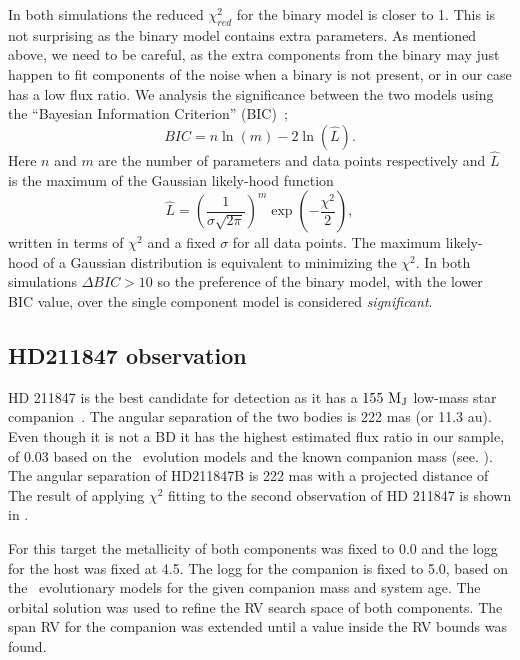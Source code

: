 In both simulations the reduced \(\chi^2_{red}\) for the binary model is closer to 1. This is not surprising as the binary model contains extra parameters. As mentioned above, we need to be careful, as the extra components from the binary may just happen to fit components of the noise when a binary is not present, or in our case has a low flux ratio.
{\rd{} We analysis the significance between the two models using the ``Bayesian Information Criterion'' ({BIC})~\citep{schwarz_estimating_1978}; }
\begin{equation}
{BIC} = n\ln{(m)} - 2\ln{(\hat{L})}.
\end{equation}
{\rd{} Here \(n\) and \(m\) are the number of parameters and data points respectively and \(\hat{L}\) is the maximum of the Gaussian likely-hood function }
\begin{equation}
\hat{L} = {\left(\frac{1}{\sigma \sqrt{2\pi}}\right)}^{m} \exp{\left(-\frac{\chi^2}{2}\right)},
\end{equation}
{\rd{} written in terms of \(\chi^2\) and a fixed \(\sigma\) for all data points. The maximum likely-hood of a Gaussian distribution is equivalent  to minimizing the \(\chi^2\). In both simulations \(\Delta {BIC} >10\) so the preference of the binary model, with the lower {BIC} value, over the single component model is considered \emph{significant}.}



\subsection{HD211847 observation}
\label{subsection:results-hd211847}
{HD 211847} is the best candidate for detection as it has a \(\rm 155~M_J\) low-mass star companion~\citet{moutou_eccentricity_2017}. The angular separation of the two bodies is 222 mas (or 11.3 au). Even though it is not a BD it has the highest estimated flux ratio in our sample, of 0.03 based on the~\citet{baraffe_new_2015} evolution models and the known companion mass (see. ). The angular separation of HD211847B is 222 mas with a projected distance of The result of applying \(\chi^2\) fitting to the second observation of {HD 211847} is shown in .

For this target the metallicity of both components was fixed to 0.0 and the logg for the host was fixed at 4.5. The logg for the companion is fixed to 5.0, based on the~\citet{baraffe_new_2015} evolutionary models for the given companion mass and system age. The orbital solution was used to refine the {RV} search space of both components. The span {RV} for the companion was extended until a value inside the {RV} bounds was found.

